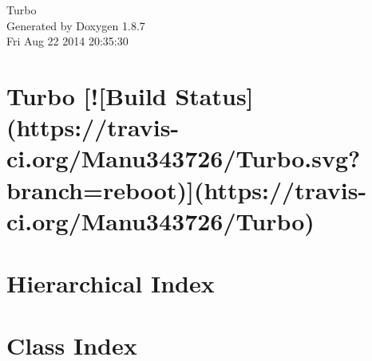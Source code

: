 \documentclass[twoside]{book}
\newcommand{\+}{\discretionary{\mbox{\scriptsize$\hookleftarrow$}}{}{}}
\newcommand{\clearemptydoublepage}{%
  \newpage{\pagestyle{empty}\cleardoublepage}%
}
\begin{document}
\hypersetup{pageanchor=false,
             bookmarks=true,
             bookmarksnumbered=true,
             pdfencoding=unicode
            }
\begin{titlepage}
\vspace*{7cm}
\begin{center}%
{\Large Turbo }\\
\vspace*{1cm}
{\large Generated by Doxygen 1.8.7}\\
\vspace*{0.5cm}
{\small Fri Aug 22 2014 20:35:30}\\
\end{center}
\end{titlepage}
\clearemptydoublepage
\tableofcontents
\clearemptydoublepage
{}
\hypersetup{pageanchor=true}

\chapter{Turbo \mbox{[}!\mbox{[}Build Status\mbox{]}(https\+://travis-\/ci.org/\+Manu343726/\+Turbo.svg?branch=reboot)\mbox{]}(https\+://travis-\/ci.org/\+Manu343726/\+Turbo)}
\label{md__r_e_a_d_m_e}
\hypertarget{md__r_e_a_d_m_e}{}

\chapter{Hierarchical Index}

\chapter{Class Index}

\end{document}
